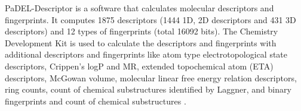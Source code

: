 PaDEL-Descriptor  \cite{Yap_2010} is a software that calculates molecular descriptors and fingerprints. It computes 1875 descriptors (1444 1D, 2D descriptors and 431 3D descriptors) and 12 types of fingerprints (total 16092 bits). The Chemistry Development Kit is used to calculate the descriptors and fingerprints with additional descriptors and fingerprints like atom type electrotopological state descriptors, Crippen's logP and MR, extended topochemical atom (ETA) descriptors, McGowan volume, molecular linear free energy relation descriptors, ring counts, count of chemical substructures identified by Laggner, and binary fingerprints and count of chemical substructures \cite{Yap_2010}.